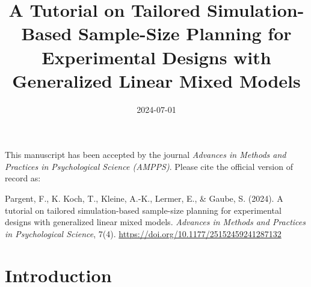 \documentclass[
  man,
  floatsintext,
  longtable,
  a4paper,
  nolmodern,
  notxfonts,
  notimes,
  colorlinks=true,linkcolor=blue,citecolor=blue,urlcolor=blue]{apa7}
\title{A Tutorial on Tailored Simulation-Based Sample-Size Planning for
Experimental Designs with Generalized Linear Mixed Models}
\date{2024-07-01}
\begin{document}
\maketitle


\setcounter{secnumdepth}{-\maxdimen} %

\setlength\LTleft{0pt}


\begin{tcolorbox}[enhanced jigsaw, toprule=.15mm, bottomtitle=1mm, arc=.35mm, toptitle=1mm, left=2mm, opacityback=0, colbacktitle=quarto-callout-important-color!10!white, colback=white, opacitybacktitle=0.6, rightrule=.15mm, breakable, title=\textcolor{quarto-callout-important-color}{\faExclamation}\hspace{0.5em}{Important}, colframe=quarto-callout-important-color-frame, titlerule=0mm, bottomrule=.15mm, coltitle=black, leftrule=.75mm]

This manuscript has been accepted by the journal \emph{Advances in
Methods and Practices in Psychological Science (AMPPS)}. Please cite the
official version of record as:

Pargent, F., K. Koch, T., Kleine, A.-K., Lermer, E., \& Gaube, S.
(2024). A tutorial on tailored simulation-based sample-size planning for
experimental designs with generalized linear mixed models.
\emph{Advances in Methods and Practices in Psychological Science}, 7(4).
\url{https://doi.org/10.1177/25152459241287132}

\end{tcolorbox}

\section{Introduction}\label{introduction}
\end{document}
